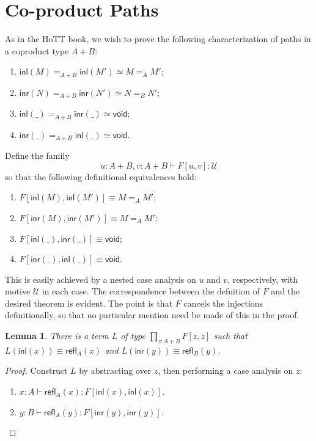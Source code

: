 \documentclass{article}
\newcommand{\zeroty}{\mathsf{void}}
\newcommand{\sumty}[2]{{#1}+{#2}}
\newcommand{\inleft}[1]{\mathsf{inl}(#1)}
\newcommand{\inright}[1]{\mathsf{inr}{(#1)}}
\newcommand{\idty}[3]{{#2}\mathbin{=_{#1}}{#3}}
\newcommand{\refl}[2]{\mathsf{refl}_{#1}({#2})}
\newcommand{\prodty}[3]{\prod_{{#1}{:}{#2}}{#3}}
\newcommand{\app}[2]{{#1}({#2})}
\newcommand{\univty}{\mathcal{U}}
\newtheorem{lemma}[theorem]{Lemma}
\begin{document}
\section{Co-product Paths}

As in the HoTT book, we wish to prove the following characterization of paths in a coproduct type $A+B$:
\begin{enumerate}
\item $\idty{\sumty{A}{B}}{\inleft{M}}{\inleft{M'}} \simeq \idty{A}{M}{M'}$;
\item $\idty{\sumty{A}{B}}{\inright{N}}{\inright{N'}} \simeq \idty{B}{N}{N'}$;
\item $\idty{\sumty{A}{B}}{\inleft{\_}}{\inright{\_}} \simeq \zeroty$;
\item $\idty{\sumty{A}{B}}{\inright{\_}}{\inleft{\_}} \simeq \zeroty$.
\end{enumerate}

Define the family $$u:\sumty{A}{B},v:\sumty{A}{B}\vdash F[u,v]:\univty$$ so that the following definitional equivalences hold:
\begin{enumerate}
\item $F[\inleft{M},\inleft{M'}]\equiv \idty{A}{M}{M'}$;
\item $F[\inright{M},\inright{M'}]\equiv \idty{A}{M}{M'}$;
\item $F[\inleft{\_},\inright{\_}]\equiv\zeroty$;
\item $F[\inright{\_},\inleft{\_}]\equiv\zeroty$.
\end{enumerate}
This is easily achieved by a nested case analysis on $u$ and $v$, respectively, with motive $\univty$ in each case.  The correspondence between the defnition of $F$ and the desired theorem is evident.  The point is that $F$ cancels the injections definitionally, so that no particular mention need be made of this in the proof.

\begin{lemma}
  \label{L-lemma}
  There is a term $L$ of type $\prodty{z}{\sumty{A}{B}}{F[z,z]}$ such that $\app{L}{\inleft{x}}\equiv \refl{A}{x}$ and $\app{L}{\inright{y}}\equiv \refl{B}{y}$.
\end{lemma}
\begin{proof}
  Construct $L$ by abstracting over $z$, then performing a case analysis on $z$:
  \begin{enumerate}
  \item $x:A\vdash \refl{A}{x}:F[\inleft{x},\inleft{x}]$.
  \item $y:B\vdash \refl{A}{y}:F[\inright{y},\inright{y}]$.
  \end{enumerate}
\end{proof}
\end{document}
